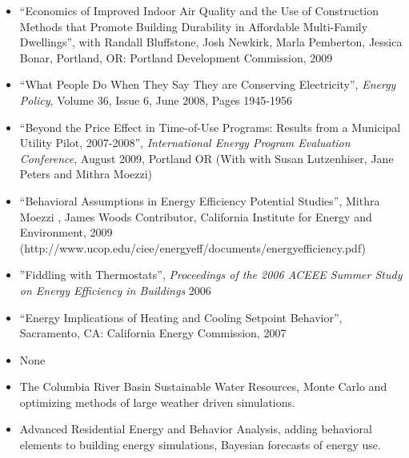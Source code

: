 \documentclass[times,12pt]{article} %
\begin{document}
\begin{itemize}

 \item ``Economics of Improved Indoor Air Quality and the Use of
      Construction Methods that Promote Building Durability in
      Affordable Multi-Family Dwellings'', with Randall Bluffstone, Josh
      Newkirk, Marla Pemberton, Jessica Bonar, Portland, OR: Portland
      Development Commission, 2009

     \item ``What People Do When They Say They are Conserving Electricity'', \emph{Energy Policy}, Volume 36, Issue 6, June 2008, Pages 1945-1956 

\item ``Beyond the Price Effect in Time-of-Use Programs: 
Results from a Municipal Utility Pilot, 2007-2008'', \emph{International Energy Program Evaluation Conference}, August 2009, Portland OR (With with Susan Lutzenhiser, Jane Peters and Mithra Moezzi)

\item ``Behavioral Assumptions in Energy Efficiency Potential
      Studies'', Mithra Moezzi , James Woods Contributor, California
      Institute for Energy and Environment, 2009 (http://www.ucop.edu/ciee/energyeff/documents/energyefficiency.pdf)
 
\item ''Fiddling with Thermostats'', \emph{Proceedings of the 2006 ACEEE Summer Study on Energy Efficiency in Buildings} 2006

    \item ``Energy Implications of Heating and Cooling Setpoint
      Behavior'', Sacramento, CA: California Energy Commission, 2007

\end{itemize}



\begin{itemize}
 \item None
\end{itemize}


\begin{itemize}
 \item The Columbia River Basin Sustainable Water Resources, Monte Carlo and optimizing methods of large weather driven simulations.


 \item Advanced Residential Energy and Behavior Analysis, adding behavioral elements to building energy simulations, Bayesian forecasts of energy use.

\end{itemize}
\end{document}
